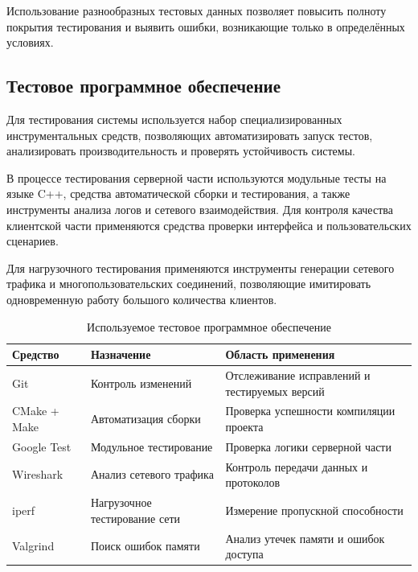 \documentclass[14pt,a4paper]{extarticle}
\begin{document}
Использование разнообразных тестовых данных позволяет повысить полноту покрытия тестирования и выявить ошибки, возникающие только в определённых условиях.

\subsection{Тестовое программное обеспечение}

Для тестирования системы используется набор специализированных инструментальных средств, позволяющих автоматизировать запуск тестов, анализировать производительность и проверять устойчивость системы.

В процессе тестирования серверной части используются модульные тесты на языке C++, средства автоматической сборки и тестирования, а также инструменты анализа логов и сетевого взаимодействия. Для контроля качества клиентской части применяются средства проверки интерфейса и пользовательских сценариев.

Для нагрузочного тестирования применяются инструменты генерации сетевого трафика и многопользовательских соединений, позволяющие имитировать одновременную работу большого количества клиентов.

\begin{table}[H]
\centering
\caption{Используемое тестовое программное обеспечение}
\begin{tabular}{|p{4cm}|p{4cm}|p{5cm}|}
\hline
\textbf{Средство} &
\textbf{Назначение} &
\textbf{Область применения} \\
\hline

Git &
Контроль изменений &
Отслеживание исправлений и тестируемых версий \\
\hline

CMake + Make &
Автоматизация сборки &
Проверка успешности компиляции проекта \\
\hline

Google Test &
Модульное тестирование &
Проверка логики серверной части \\
\hline

Wireshark &
Анализ сетевого трафика &
Контроль передачи данных и протоколов \\
\hline

iperf &
Нагрузочное тестирование сети &
Измерение пропускной способности \\
\hline

Valgrind &
Поиск ошибок памяти &
Анализ утечек памяти и ошибок доступа \\
\hline

\end{tabular}
\end{table}
\end{document}

